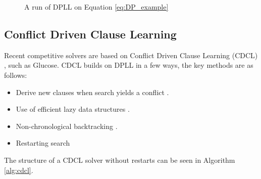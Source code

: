 \begin{figure}
    \centering
    \caption{A run of DPLL on Equation \ref{eq:DP_example}}
    \label{fig:run_dpll}
\end{figure}

\subsection[CDCL]{Conflict Driven Clause Learning}
Recent competitive solvers are based on Conflict Driven Clause Learning (CDCL) 
\cite{SAT_Comp2017, sat2018descriptions}, such as Glucose.
CDCL builds on DPLL in a few ways, the key methods are as follows:

\begin{itemize}
    \item Derive new clauses when search yields a conflict \cite{marques1999grasp}.
    \item Use of efficient lazy data structures \cite{moskewicz2001chaff, ryan2004efficient}.
    \item Non-chronological backtracking \cite{marques1999grasp}.
    \item Restarting search \cite{gomes1998boosting, gomes2000heavy}
\end{itemize}

The structure of a CDCL solver without restarts can be seen in Algorithm \ref{alg:cdcl}.

